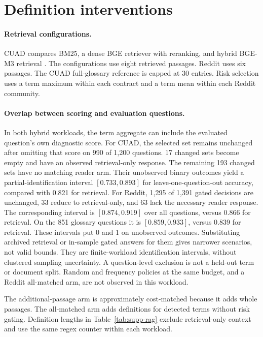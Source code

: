 \section{Definition interventions}
\label{app:interventions}



\paragraph{Retrieval configurations.}
CUAD compares BM25, a dense BGE retriever with reranking, and hybrid BGE-M3 retrieval \citep{bm25,bge,bge-m3}. The configurations use eight retrieved passages. Reddit uses six passages. The CUAD full-glossary reference is capped at 30 entries. Risk selection uses a term maximum within each contract and a term mean within each Reddit community.



\paragraph{Overlap between scoring and evaluation questions.}
In both hybrid workloads, the term aggregate can include the evaluated question's own diagnostic score. For CUAD, the selected set remains unchanged after omitting that score on 990 of 1,200 questions. 17 changed sets become empty and have an observed retrieval-only response. The remaining 193 changed sets have no matching reader arm. Their unobserved binary outcomes yield a partial-identification interval $[0.733,0.893]$ for leave-one-question-out accuracy, compared with 0.821 for retrieval. For Reddit, 1,295 of 1,391 gated decisions are unchanged, 33 reduce to retrieval-only, and 63 lack the necessary reader response. The corresponding interval is $[0.874,0.919]$ over all questions, versus 0.866 for retrieval. On the 851 glossary questions it is $[0.859,0.933]$, versus 0.839 for retrieval. These intervals put 0 and 1 on unobserved outcomes. Substituting archived retrieval or in-sample gated answers for them gives narrower scenarios, not valid bounds. They are finite-workload identification intervals, without clustered sampling uncertainty. A question-level exclusion is not a held-out term or document split. Random and frequency policies at the same budget, and a Reddit all-matched arm, are not observed in this workload.

The additional-passage arm is approximately cost-matched because it adds whole passages. The all-matched arm adds definitions for detected terms without risk gating. Definition lengths in Table~\ref{tab:supp-rag} exclude retrieval-only context and use the same regex counter within each workload.


